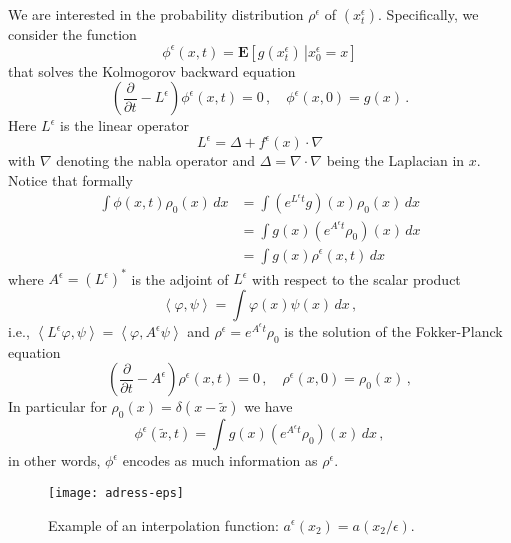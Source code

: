 \documentclass{amsart}
\newcommand{\bk}[2]{\left\langle #1,#2\right\rangle}
\newcommand{\bE}{{\mathbf E}}
\newcommand{\eps}{\epsilon}
\newcommand{\wrt}{with respect to }
\begin{document}
We are interested in the probability distribution $\rho^{\eps}$ of $(x^{\eps}_{t})$. Specifically, we consider the function
\begin{equation*}
\phi^{\eps}(x,t) = \bE\left[g(x^{\eps}_{t})\,\right|\left.x^{\eps}_{0}=x\right]
\end{equation*}
that solves the Kolmogorov backward equation
\begin{equation}\label{bke}
\left(\frac{\partial}{\partial t} - L^{\eps} \right)\phi^{\eps}(x,t) = 0\,,\quad \phi^{\eps}(x,0)=g(x)\,.
\end{equation}
Here $L^{\eps}$ is the linear operator
\begin{equation*}
L^{\eps} = \Delta + f^{\eps}(x)\cdot\nabla
\end{equation*}
with $\nabla$ denoting the nabla operator and $\Delta=\nabla\cdot\nabla$ being the Laplacian in $x$. Notice that formally
\begin{align*}
\int\phi(x,t)\rho_{0}(x)\,dx & = \int (e^{L^{\eps}t}g)(x)\rho_{0}(x)\,dx\\
 & = \int g(x) (e^{A^{\eps}t}\rho_{0})(x)\,dx\\
 & = \int g(x)\rho^{\eps}(x,t)\,dx
\end{align*}
where $A^{\eps}=(L^{\eps})^{*}$ is the adjoint of $L^{\eps}$ \wrt the scalar product
\begin{equation*}
\bk{\varphi}{\psi} = \int \varphi(x)\psi(x)\,dx\,,
\end{equation*}
i.e., $\bk{L^{\eps}\varphi}{\psi}=\bk{\varphi}{A^{\eps}\psi}$ and $\rho^{\eps}=e^{A^{\eps}t}\rho_{0}$ is the solution of the Fokker-Planck equation
\begin{equation}\label{bke}
\left(\frac{\partial}{\partial t} - A^{\eps} \right)\rho^{\eps}(x,t) = 0\,,\quad \rho^{\eps}(x,0)=\rho_{0}(x)\,,
\end{equation}
In particular for $\rho_{0}(x)=\delta(x-\tilde{x})$ we have
\begin{equation*}
\phi^{\eps}(\tilde{x},t) = \int g(x)(e^{A^{\eps}t}\rho_{0})(x)\,dx\,,
\end{equation*}
in other words, $\phi^{\eps}$ encodes as much information as $\rho^{\eps}$. 

\begin{figure}
 \begin{center}
   \texttt{[image: adress-eps]}
     \caption{Example of an interpolation function: $a^{\eps}(x_{2})=a(x_{2}/\eps)$.}\label{fig:a}
   \end{center}
\end{figure}
\end{document}
